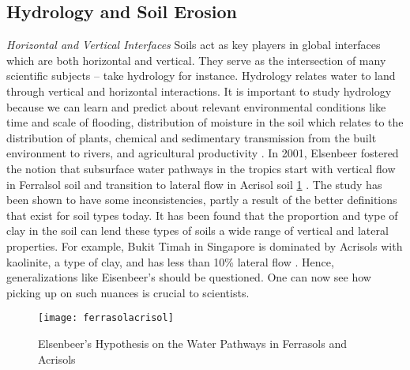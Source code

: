 \subsection{Hydrology and Soil Erosion}
\textit{Horizontal and Vertical Interfaces} \newline
Soils act as key players in global interfaces which are both horizontal and vertical. They serve as the intersection of many scientific subjects -- take hydrology for instance. Hydrology relates water to land through vertical and horizontal interactions. It is important to study hydrology because we can learn and predict about relevant environmental conditions like time and scale of flooding, distribution of moisture in the soil which relates to the distribution of plants, chemical and sedimentary transmission from the built environment to rivers, and agricultural productivity \citep{chappell2010soil}. In 2001, Elsenbeer fostered the notion that subsurface water pathways in the tropics start with vertical flow in Ferralsol soil and transition to lateral flow in Acrisol soil \ref{fig:ferrasol and acrisol} \citep{elsenbeer2001hydrologic}. The study has been shown to have some inconsistencies, partly a result of the better definitions that exist for soil types today. It has been found that the proportion and type of clay in the soil can lend these types of soils a wide range of vertical and lateral properties. For example, Bukit Timah in Singapore is dominated by Acrisols with kaolinite, a type of clay, and has less than 10\% lateral flow \citep{chappell2005contrasting}. Hence, generalizations like Eisenbeer's should be questioned. One can now see how picking up on such nuances is crucial to scientists.


\begin{figure}
\texttt{[image: ferrasolacrisol]}
\caption{Elsenbeer's Hypothesis on the Water Pathways in Ferrasols and Acrisols}
\label{fig:ferrasol and acrisol}
\end{figure}

